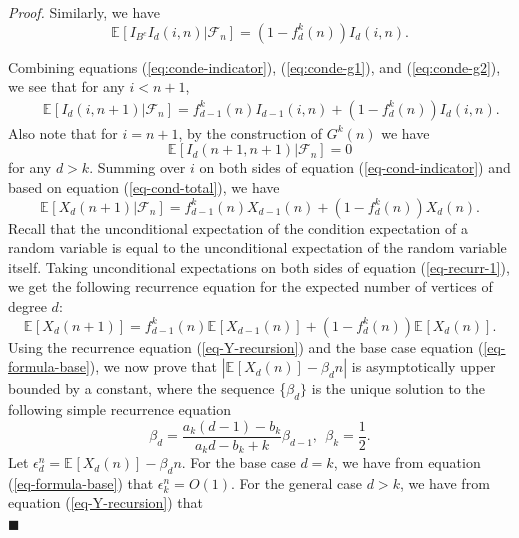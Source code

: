 \documentclass[11pt]{article}
\providecommand{\expectation}[2]{\mathbb{E}_{#2}\left[#1\right]}
\newenvironment{proof}[0]{\textit{Proof.} }{\hfill  $\blacksquare$ }
\providecommand{\vcprob}[3]{f^{#1}_{#2}(#3)}
\providecommand{\rktree}[2]{G^{#1}(#2)}
\providecommand{\tdeg}[2]{X_{#1}(#2)}
\providecommand{\edeg}[2]{\expectation{\tdeg{#1}{#2}}{}}
\begin{document}
\begin{proof}
Similarly, we have
\begin{equation} 
\label{eq:conde-g2}
\expectation{I_{B^c}I_{d}(i, n) | \mathcal{F}_n}{}
 = (1 - \vcprob{k}{d}{n}) I_d(i, n).
\end{equation}
 
Combining equations (\ref{eq:conde-indicator}), (\ref{eq:conde-g1}),
and (\ref{eq:conde-g2}), we see that
for any $i < n + 1$,
\begin{eqnarray}
\label{eq-cond-indicator}
&&\expectation{I_d(i, n + 1) | \mathcal{F}_n}{} = \vcprob{k}{d-1}{n}I_{d-1}(i, n) + (1 - \vcprob{k}{d}{n}) I_d(i, n).
\end{eqnarray}
Also note that for $i = n + 1$, by the construction of $\rktree{k}{n}$ we have 
$$
\expectation{I_{d}(n + 1, n + 1) | \mathcal{F}_n}{} = 0
$$ 
for any $d > k$.
Summing over $i$ on both sides of equation (\ref{eq-cond-indicator}) and based
on equation (\ref{eq-cond-total}), we have
\begin{equation}
\label{eq-recurr-1}
\expectation{\tdeg{d}{n + 1} | \mathcal{F}_n}{} = \vcprob{k}{d - 1}{n}\tdeg{d - 1}{n} + (1 - \vcprob{k}{d}{n})\tdeg{d}{n}.
\end{equation}
Recall that the unconditional expectation of the condition expectation of a random variable
 is equal to the unconditional expectation of the random variable itself. 
Taking unconditional  expectations  on both sides of equation (\ref{eq-recurr-1}),
we get the following recurrence equation for the expected number of vertices of degree $d$:
\begin{equation}
\label{eq-Y-recursion}
\edeg{d}{n + 1} = \vcprob{k}{d - 1}{n}\edeg{d - 1}{n} + (1 - \vcprob{k}{d}{n})\edeg{d}{n}.
\end{equation}
Using the recurrence equation (\ref{eq-Y-recursion}) and 
the base case equation (\ref{eq-formula-base}), we now prove
that 
$|\edeg{d}{n} - \beta_{d}n|$ is asymptotically upper bounded by a constant, 
where the  sequence \{$\beta_d\}$ is the
unique solution to the following simple recurrence equation      
\begin{equation}
\label{eq-limit-case}
 \beta_d = \frac{a_k(d - 1) - b_k}{a_kd - b_k + k} \beta_{d - 1},\ \  \beta_{k} = \frac{1}{2}.
\end{equation}
Let $\epsilon_d^n = \edeg{d}{n} - \beta_dn$. For the base case $d = k$, we have from 
equation (\ref{eq-formula-base}) that $\epsilon_k^{n}  =  O(1)$.
For the general case $d > k$, we have from equation (\ref{eq-Y-recursion}) that
\begin{eqnarray}
\label{eq:epsilon}

\end{eqnarray}
\end{proof}
\end{document}
